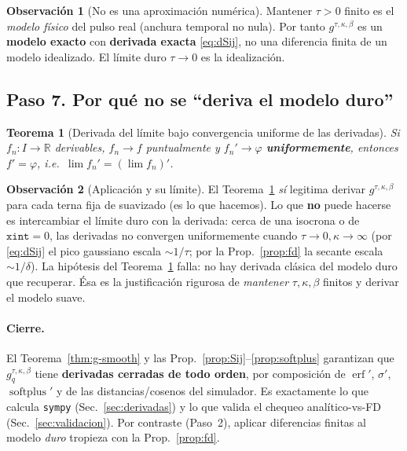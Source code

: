 \documentclass[11pt,a4paper]{article}
\theoremstyle{plain}
\newtheorem{theorem}{Teorema}
\theoremstyle{definition}
\newtheorem{remark}{Observaci\'on}
\newcommand{\R}{\mathbb{R}}
\newcommand{\softplus}{\operatorname{softplus}}
\newcommand{\erf}{\operatorname{erf}}
\begin{document}
\begin{remark}[No es una aproximaci\'on num\'erica]
Mantener $\tau>0$ finito es el \emph{modelo f\'isico} del pulso real (anchura
temporal no nula). Por tanto $g^{\tau,\kappa,\beta}$ es un \textbf{modelo exacto}
con \textbf{derivada exacta} \eqref{eq:dSij}, no una diferencia finita de un
modelo idealizado. El l\'imite duro $\tau\to0$ es la idealizaci\'on.
\end{remark}

\subsection*{Paso 7. Por qu\'e no se ``deriva el modelo duro''}
\label{sec:intercambio}

\begin{theorem}[Derivada del l\'imite bajo convergencia uniforme de las derivadas]\label{thm:uniforme}
Si $f_n:I\to\R$ derivables, $f_n\to f$ puntualmente y $f_n'\to\varphi$
\textbf{uniformemente}, entonces $f'=\varphi$, i.e.\ $\lim f_n'=(\lim f_n)'$.
\end{theorem}

\begin{remark}[Aplicaci\'on y su l\'imite]
El Teorema~\ref{thm:uniforme} \emph{s\'i} legitima derivar
$g^{\tau,\kappa,\beta}$ para cada terna fija de suavizado (es lo que hacemos). Lo
que \textbf{no} puede hacerse es intercambiar el l\'imite duro con la derivada:
cerca de una isocrona o de $\texttt{xint}=0$, las derivadas no convergen
uniformemente cuando $\tau\to0,\kappa\to\infty$ (por \eqref{eq:dSij} el pico
gaussiano escala $\sim1/\tau$; por la Prop.~\ref{prop:fd} la secante escala
$\sim1/\delta$). La hip\'otesis del Teorema~\ref{thm:uniforme} falla: no hay
derivada cl\'asica del modelo duro que recuperar. \'Esa es la justificaci\'on
rigurosa de \emph{mantener} $\tau,\kappa,\beta$ finitos y derivar el modelo suave.
\end{remark}

\paragraph{Cierre.} El Teorema~\ref{thm:g-smooth} y las
Prop.~\ref{prop:Sij}--\ref{prop:softplus} garantizan que
$g^{\tau,\kappa,\beta}_q$ tiene \textbf{derivadas cerradas de todo orden}, por
composici\'on de $\erf'$, $\sigma'$, $\softplus'$ y de las distancias/cosenos del
simulador. Es exactamente lo que calcula \texttt{sympy}
(Sec.~\ref{sec:derivadas}) y lo que valida el chequeo anal\'itico-vs-FD
(Sec.~\ref{sec:validacion}). Por contraste (Paso~2), aplicar diferencias finitas
al modelo \emph{duro} tropieza con la Prop.~\ref{prop:fd}.
\end{document}
